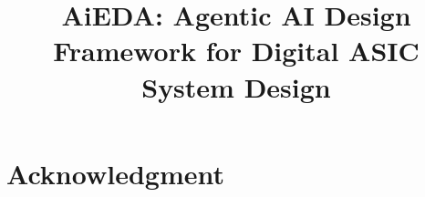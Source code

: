 \documentclass[conference]{IEEEtran}
\begin{document}
\title{AiEDA: Agentic AI Design Framework for Digital ASIC System Design}


\maketitle




%







\section*{Acknowledgment}



\end{document}
